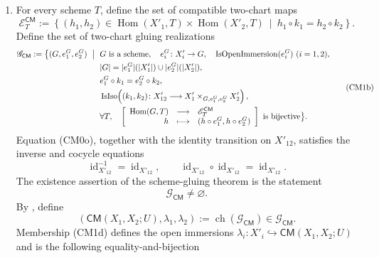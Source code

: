 \begin{definition}
\begin{enumerate}
    \item For every scheme \(T\), define the set of compatible two-chart maps
      \[
        \mathscr E_T^{\mathsf{CM}}:=
          \left\{(h_1,h_2)\in
            \operatorname{Hom}(X'_1,T)\times\operatorname{Hom}(X'_2,T)
          \ \middle|\ h_1\circ k_1=h_2\circ k_2\right\}.       \tag{CM1a}
      \]
      Define the set of two-chart gluing realizations
      \[
      \begin{aligned}
        \mathscr G_{\mathsf{CM}}:=
        \bigl\{(G,e_1^G,e_2^G)\ \bigm|\ {}&
          G\text{ is a scheme},\quad
          e_i^G\colon X'_i\to G,\quad
          \operatorname{IsOpenImmersion}(e_i^G)\ (i=1,2),\\
        &|G|=|e_1^G|(|X'_1|)\cup |e_2^G|(|X'_2|),\\
        &e_1^G\circ k_1=e_2^G\circ k_2,\\
        &\operatorname{IsIso}\!\left(
          (k_1,k_2)\colon X'_{12}\longrightarrow
            X'_1\times_{G,e_1^G,e_2^G}X'_2\right),\\
        &\forall T,\quad
          \left[
          \begin{array}{rcl}
            \operatorname{Hom}(G,T)&\longrightarrow&
              \mathscr E_T^{\mathsf{CM}}\\
            h&\longmapsto&(h\circ e_1^G,h\circ e_2^G)
          \end{array}
          \right]\text{ is bijective}\bigr\}.
      \end{aligned}                                                \tag{CM1b}
      \]
      Equation (CM0o), together with the identity transition on
      \(X'_{12}\), satisfies the inverse and cocycle equations
      \[
        \operatorname{id}_{X'_{12}}^{-1}
          =\operatorname{id}_{X'_{12}},\qquad
        \operatorname{id}_{X'_{12}}\circ
          \operatorname{id}_{X'_{12}}
          =\operatorname{id}_{X'_{12}}.
      \]
      The existence assertion of the scheme-gluing theorem
      \cite[\href{https://stacks.math.columbia.edu/tag/01JA}{Tag 01JA}]
      {stacks-project} is the statement
      \[
        \mathscr G_{\mathsf{CM}}\ne\varnothing.                  \tag{CM1c}
      \]
      By , define
      \[
        (\mathsf{CM}(X_1,X_2;U),\lambda_1,\lambda_2)
          :=\operatorname{ch}(\mathscr G_{\mathsf{CM}})
          \in\mathscr G_{\mathsf{CM}}.                           \tag{CM1d}
      \]
      Membership (CM1d) defines the open immersions
      \(\lambda_i\colon X'_i\hookrightarrow
        \mathsf{CM}(X_1,X_2;U)\) and is the following equality-and-bijection

\end{enumerate}
\end{definition}
